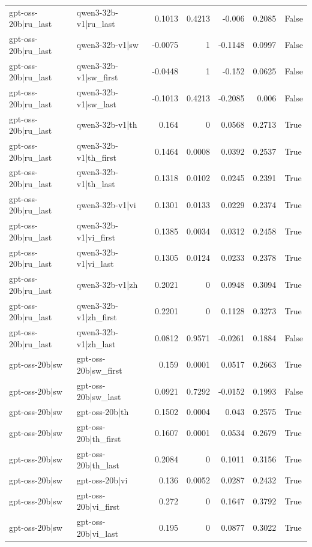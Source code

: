 \begin{table}
\begin{tabular}{l l r r r r l}
gpt-oss-20b|ru_last & qwen3-32b-v1|ru_last & 0.1013 & 0.4213 & -0.006 & 0.2085 & False \\
gpt-oss-20b|ru_last & qwen3-32b-v1|sw & -0.0075 & 1 & -0.1148 & 0.0997 & False \\
gpt-oss-20b|ru_last & qwen3-32b-v1|sw_first & -0.0448 & 1 & -0.152 & 0.0625 & False \\
gpt-oss-20b|ru_last & qwen3-32b-v1|sw_last & -0.1013 & 0.4213 & -0.2085 & 0.006 & False \\
gpt-oss-20b|ru_last & qwen3-32b-v1|th & 0.164 & 0 & 0.0568 & 0.2713 & True \\
gpt-oss-20b|ru_last & qwen3-32b-v1|th_first & 0.1464 & 0.0008 & 0.0392 & 0.2537 & True \\
gpt-oss-20b|ru_last & qwen3-32b-v1|th_last & 0.1318 & 0.0102 & 0.0245 & 0.2391 & True \\
gpt-oss-20b|ru_last & qwen3-32b-v1|vi & 0.1301 & 0.0133 & 0.0229 & 0.2374 & True \\
gpt-oss-20b|ru_last & qwen3-32b-v1|vi_first & 0.1385 & 0.0034 & 0.0312 & 0.2458 & True \\
gpt-oss-20b|ru_last & qwen3-32b-v1|vi_last & 0.1305 & 0.0124 & 0.0233 & 0.2378 & True \\
gpt-oss-20b|ru_last & qwen3-32b-v1|zh & 0.2021 & 0 & 0.0948 & 0.3094 & True \\
gpt-oss-20b|ru_last & qwen3-32b-v1|zh_first & 0.2201 & 0 & 0.1128 & 0.3273 & True \\
gpt-oss-20b|ru_last & qwen3-32b-v1|zh_last & 0.0812 & 0.9571 & -0.0261 & 0.1884 & False \\
gpt-oss-20b|sw & gpt-oss-20b|sw_first & 0.159 & 0.0001 & 0.0517 & 0.2663 & True \\
gpt-oss-20b|sw & gpt-oss-20b|sw_last & 0.0921 & 0.7292 & -0.0152 & 0.1993 & False \\
gpt-oss-20b|sw & gpt-oss-20b|th & 0.1502 & 0.0004 & 0.043 & 0.2575 & True \\
gpt-oss-20b|sw & gpt-oss-20b|th_first & 0.1607 & 0.0001 & 0.0534 & 0.2679 & True \\
gpt-oss-20b|sw & gpt-oss-20b|th_last & 0.2084 & 0 & 0.1011 & 0.3156 & True \\
gpt-oss-20b|sw & gpt-oss-20b|vi & 0.136 & 0.0052 & 0.0287 & 0.2432 & True \\
gpt-oss-20b|sw & gpt-oss-20b|vi_first & 0.272 & 0 & 0.1647 & 0.3792 & True \\
gpt-oss-20b|sw & gpt-oss-20b|vi_last & 0.195 & 0 & 0.0877 & 0.3022 & True \\

\end{tabular}
\end{table}
